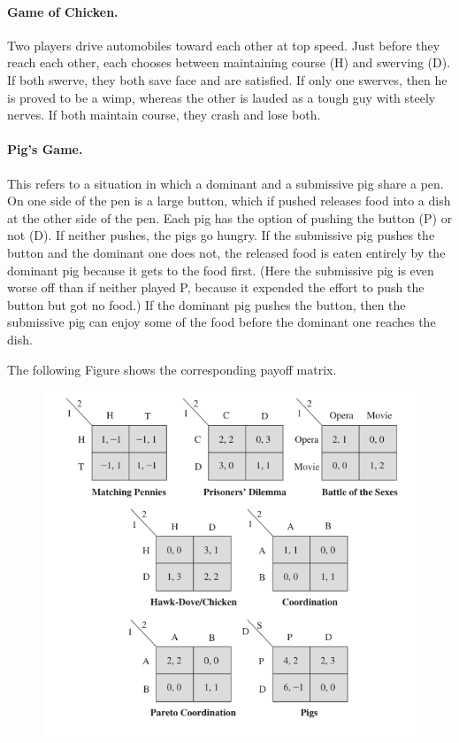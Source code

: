 \paragraph{Game of Chicken.} Two players drive automobiles toward each other at top speed. Just before they reach each other, each chooses between maintaining course (H) and swerving (D). If both swerve, they both save face and are satisfied. If only one swerves, then he is proved to be a wimp, whereas the other is lauded as a tough guy with steely nerves. If both maintain course, they crash and lose both.

\paragraph{Pig's Game.} This refers to a situation in which a dominant and a submissive pig share a pen. On one side of the pen is a large button, which if pushed releases food into a dish at the other side of the pen. Each pig has the option of pushing the button (P) or not (D). If neither pushes, the pigs go hungry. If the submissive pig pushes the button and the dominant one does not, the released food is eaten entirely by the dominant pig because it gets to the food first. (Here the submissive pig is even worse off than if neither played P, because it expended the effort to push the button but got no food.) If the dominant pig pushes the button, then the submissive pig can enjoy some of the food before the dominant one reaches the dish.

The following Figure shows the corresponding payoff matrix.

\begin{figure}[H]
    \centering
    \includegraphics[scale=0.7]{images/2023-10-10-game_theory_04a.png}
\end{figure}

